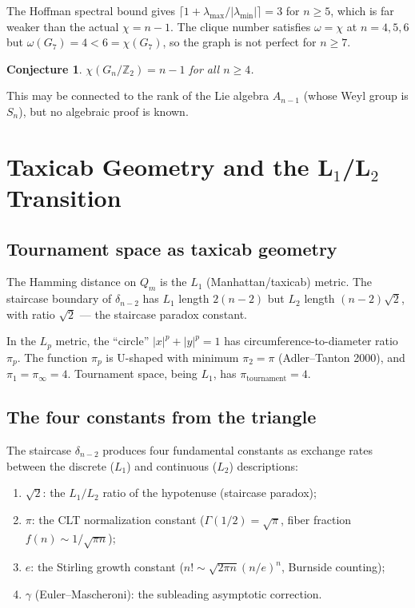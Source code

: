 \documentclass[11pt,a4paper]{article}
\newtheorem{conjecture}[theorem]{Conjecture}
\theoremstyle{definition}
\theoremstyle{remark}
\begin{document}
The Hoffman spectral bound gives $\lceil 1 + \lambda_{\max}/|\lambda_{\min}| \rceil = 3$ for $n \geq 5$, which is far weaker than the actual $\chi = n-1$. The clique number satisfies $\omega = \chi$ at $n = 4, 5, 6$ but $\omega(G_7) = 4 < 6 = \chi(G_7)$, so the graph is not perfect for $n \geq 7$.

\begin{conjecture}
$\chi(G_n/\mathbb{Z}_2) = n - 1$ for all $n \geq 4$.
\end{conjecture}

This may be connected to the rank of the Lie algebra $A_{n-1}$ (whose Weyl group is $S_n$), but no algebraic proof is known.

\section{Taxicab Geometry and the L$_1$/L$_2$ Transition}
\label{sec:taxicab}

\subsection{Tournament space as taxicab geometry}

The Hamming distance on $Q_m$ is the $L_1$ (Manhattan/taxicab) metric. The staircase boundary of $\delta_{n-2}$ has $L_1$ length $2(n-2)$ but $L_2$ length $(n-2)\sqrt{2}$, with ratio $\sqrt{2}$ --- the staircase paradox constant.

In the $L_p$ metric, the ``circle'' $|x|^p + |y|^p = 1$ has circumference-to-diameter ratio $\pi_p$. The function $\pi_p$ is U-shaped with minimum $\pi_2 = \pi$ (Adler--Tanton 2000), and $\pi_1 = \pi_\infty = 4$. Tournament space, being $L_1$, has $\pi_{\text{tournament}} = 4$.

\subsection{The four constants from the triangle}

The staircase $\delta_{n-2}$ produces four fundamental constants as exchange rates between the discrete ($L_1$) and continuous ($L_2$) descriptions:
\begin{enumerate}
\item $\sqrt{2}$: the $L_1/L_2$ ratio of the hypotenuse (staircase paradox);
\item $\pi$: the CLT normalization constant ($\Gamma(1/2) = \sqrt{\pi}$, fiber fraction $f(n) \sim 1/\sqrt{\pi n}$);
\item $e$: the Stirling growth constant ($n! \sim \sqrt{2\pi n}(n/e)^n$, Burnside counting);
\item $\gamma$ (Euler--Mascheroni): the subleading asymptotic correction.
\end{enumerate}
\end{document}
